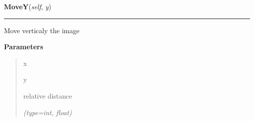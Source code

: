     \label{ImagePanel:ImagePanel:MoveY}

    \vspace{0.5ex}

\hspace{.8\funcindent}\begin{boxedminipage}{\funcwidth}

    \raggedright \textbf{MoveY}(\textit{self}, \textit{y})

    \vspace{-1.5ex}

    \rule{\textwidth}{0.5\fboxrule}
\setlength{\parskip}{2ex}
    Move verticaly the image

\setlength{\parskip}{1ex}
      \textbf{Parameters}
      \vspace{-1ex}

      \begin{quote}
        \begin{Ventry}{x}

          \item[y]

          relative distance

            {\it (type=int, float)}

        \end{Ventry}

      \end{quote}

    \end{boxedminipage}

    \vspace{0.5ex}

